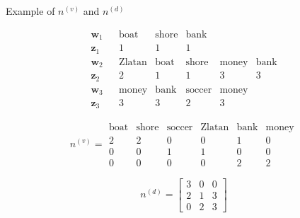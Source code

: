 \documentclass[10pt]{beamer}
\begin{document}
\begin{frame}{Example of $n^{(v)}$ and $n^{(d)}$}

\[
\begin{array}{ccccccc}
\mathbf{w}_{1} &  & \mbox{boat} & \mbox{shore} & \mbox{bank}\\
\mathbf{z}_{1} &  & 1 & 1 & 1\\
\mathbf{w}_{2} &  & \mbox{Zlatan} & \mbox{boat} & \mbox{shore} & \mbox{money} & \mbox{bank}\\
\mathbf{z}_{2} &  & 2 & 1 & 1 & 3 & 3\\
\mathbf{w}_{3} &  & \mbox{money} & \mbox{bank} & \mbox{soccer} & \mbox{money}\\
\mathbf{z}_{3} &  & 3 & 3 & 2 & 3
\end{array}
\]


\pause{}

\[
n^{(v)}=\begin{array}{cccccc}
\mbox{boat} & \mbox{shore} & \mbox{soccer} & \mbox{Zlatan} & \mbox{bank} & \mbox{money}\\
2 & 2 & 0 & 0 & 1 & 0\\
0 & 0 & 1 & 1 & 0 & 0\\
0 & 0 & 0 & 0 & 2 & 2
\end{array}
\]


\pause{}

\[
n^{(d)}=\left[\begin{array}{ccc}
3 & 0 & 0\\
2 & 1 & 3\\
0 & 2 & 3
\end{array}\right]
\]

\end{frame}
\end{document}
